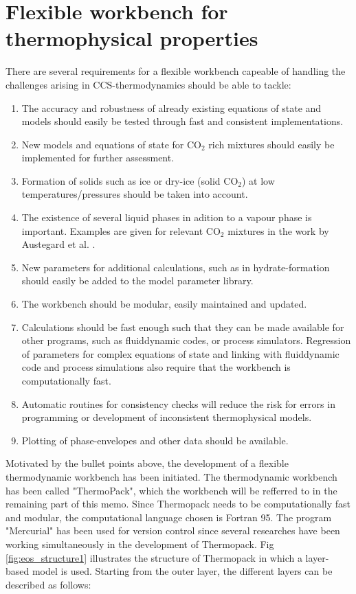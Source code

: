 \documentclass[a4paper, 12pt, english, sintefheadings, sintefcolour]{sintefmemo}
\begin{document}
\newpage
\section{Flexible workbench for thermophysical properties}
\label{Sec:framework}
There are several requirements for a flexible workbench capeable of handling
the challenges arising in CCS-thermodynamics should be able to tackle:

\begin{enumerate}
\item The accuracy and robustness of already existing equations of state and
  models should easily be tested through fast and consistent implementations.
\item New models and equations of state for CO$_2$ rich mixtures should easily
  be implemented for further assessment.
\item Formation of solids such as ice or dry-ice (solid CO$_2$) at low
  temperatures/pressures should be taken into account.
\item The existence of several liquid phases in adition to a vapour phase is
  important. Examples are given for relevant CO$_2$ mixtures in the work by
  Austegard et al. \cite{Austegard2006}.
\item New parameters for additional calculations, such as in hydrate-formation
  should easily be added to the model parameter library.
\item The workbench should be modular, easily maintained and updated.
\item Calculations should be fast enough such that they can be made available
  for other programs, such as fluiddynamic codes, or process simulators.
  Regression of parameters for complex equations of state and linking with
  fluiddynamic code and process simulations also require that the workbench is
  computationally fast.
\item Automatic routines for consistency checks will reduce the risk for
  errors in programming or development of inconsistent thermophysical models.
\item Plotting of phase-envelopes and other data should be available.
\end{enumerate}

Motivated by the bullet points above, the development of a flexible
thermodynamic workbench has been initiated. The thermodynamic workbench has
been called "ThermoPack", which the workbench will be refferred to in the
remaining part of this memo. Since Thermopack needs to be computationally fast
and modular, the computational language chosen is Fortran 95. The program
"Mercurial" has been used for version control since several researches have
been working simultaneously in the development of Thermopack. Fig
\ref{fig:eos_structure1} illustrates the structure of Thermopack in which a
layer-based model is used. Starting from the outer layer, the different layers
can be described as follows:
\end{document}
